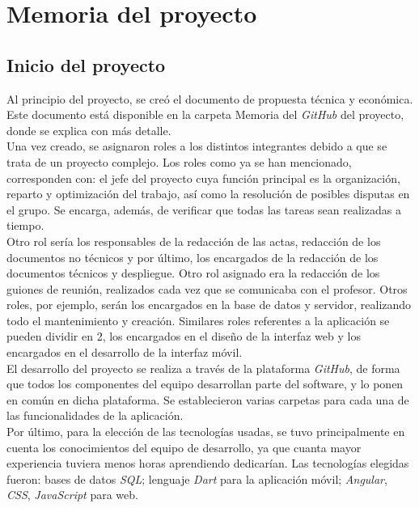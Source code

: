 \documentclass{article}
\begin{document}
\section{Memoria del proyecto}
\subsection{Inicio del proyecto}
Al principio del proyecto, se creó el documento de propuesta técnica y económica. Este documento está disponible en la carpeta Memoria del \textit{GitHub} del proyecto, donde se explica con más detalle.\\
Una vez creado, se asignaron roles a los distintos integrantes debido a que se trata de un proyecto complejo. Los roles como ya se han mencionado, corresponden con: el jefe del proyecto cuya función principal es la organización, reparto y optimización del trabajo, así como la resolución de posibles disputas en el grupo. 
Se encarga, además, de verificar que todas las tareas sean realizadas a tiempo. \\
\hfill \break
Otro rol sería los responsables de la redacción de las actas, redacción de los documentos no técnicos y por último, los encargados de la redacción de los documentos técnicos y despliegue. Otro rol asignado era la redacción de los guiones de reunión, realizados cada vez que se comunicaba con el profesor. Otros roles, por ejemplo, serán los encargados en la base de datos y servidor, realizando todo el mantenimiento y creación. Similares roles referentes a la aplicación se pueden dividir en 2, los encargados en el diseño de la interfaz web y los encargados en el desarrollo de la interfaz móvil. \\
\hfill \break
El desarrollo del proyecto se realiza a través de la plataforma \textit{GitHub}, de forma que todos los componentes del equipo desarrollan parte del software, y lo ponen en común en dicha plataforma. Se establecieron varias carpetas para cada una de las funcionalidades de la aplicación. \\
Por último, para la elección de las tecnologías usadas, se tuvo principalmente en cuenta los conocimientos del equipo de desarrollo, ya que cuanta mayor experiencia tuviera menos horas aprendiendo dedicarían. Las tecnologías elegidas fueron: bases de datos \textit{SQL}; lenguaje \textit{Dart} para la aplicación móvil; \textit{Angular}, \textit{CSS}, \textit{JavaScript} para web.
\end{document}
